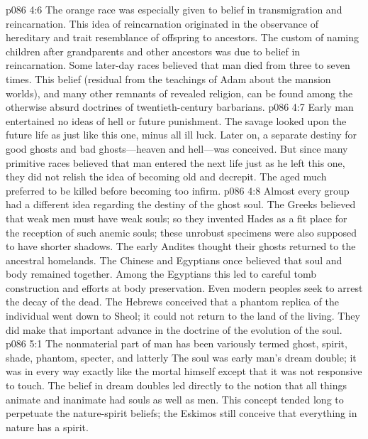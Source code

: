 \vs p086 4:6 The orange race was especially given to belief in transmigration and reincarnation. This idea of reincarnation originated in the observance of hereditary and trait resemblance of offspring to ancestors. The custom of naming children after grandparents and other ancestors was due to belief in reincarnation. Some later\hyp{}day races believed that man died from three to seven times. This belief (residual from the teachings of Adam about the mansion worlds), and many other remnants of revealed religion, can be found among the otherwise absurd doctrines of twentieth\hyp{}century barbarians.
\pc \vs p086 4:7 Early man entertained no ideas of hell or future punishment. The savage looked upon the future life as just like this one, minus all ill luck. Later on, a separate destiny for good ghosts and bad ghosts---heaven and hell---was conceived. But since many primitive races believed that man entered the next life just as he left this one, they did not relish the idea of becoming old and decrepit. The aged much preferred to be killed before becoming too infirm.
\vs p086 4:8 Almost every group had a different idea regarding the destiny of the ghost soul. The Greeks believed that weak men must have weak souls; so they invented Hades as a fit place for the reception of such anemic souls; these unrobust specimens were also supposed to have shorter shadows. The early Andites thought their ghosts returned to the ancestral homelands. The Chinese and Egyptians once believed that soul and body remained together. Among the Egyptians this led to careful tomb construction and efforts at body preservation. Even modern peoples seek to arrest the decay of the dead. The Hebrews conceived that a phantom replica of the individual went down to Sheol; it could not return to the land of the living. They did make that important advance in the doctrine of the evolution of the soul.
%
\vs p086 5:1 The nonmaterial part of man has been variously termed ghost, spirit, shade, phantom, specter, and latterly  The soul was early man’s dream double; it was in every way exactly like the mortal himself except that it was not responsive to touch. The belief in dream doubles led directly to the notion that all things animate and inanimate had souls as well as men. This concept tended long to perpetuate the nature\hyp{}spirit beliefs; the Eskimos still conceive that everything in nature has a spirit.

